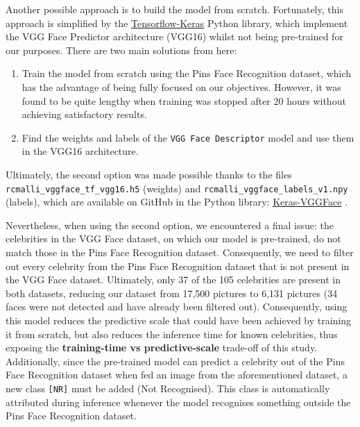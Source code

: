 \documentclass[9pt,twocolumn,twoside]{ilcss}
\theoremstyle{definition}
\theoremstyle{remark}
\theoremstyle{definition}
\theoremstyle{definition}
\begin{document}
        Another possible approach is to build the model from scratch. Fortunately, this approach is simplified by the \href{https://www.tensorflow.org/api_docs/python/tf/keras/applications/vgg16}{Tensorflow-Keras} Python library, which implement the VGG Face Predictor architecture (VGG16) \cite{simonyan2015deepconvolutionalnetworkslargescale} whilst not being pre-trained for our purposes. There are two main solutions from here:
        \begin{enumerate}[noitemsep,parsep=0pt,partopsep=0pt]
            \item Train the model from scratch using the Pins Face Recognition dataset, which has the advantage of being fully focused on our objectives. However, it was found to be quite lengthy when training was stopped after 20 hours without achieving satisfactory results.
            \item Find the weights and labels of the \texttt{VGG Face Descriptor} model and use them in the VGG16 architecture.
        \end{enumerate}

        Ultimately, the second option was made possible thanks to the files \texttt{rcmalli\_vggface\_tf\_vgg16.h5} (weights) and \texttt{rcmalli\_vggface\_labels\_v1.npy} (labels), which are available on GitHub in the Python library: \href{https://github.com/rcmalli/keras-vggface}{Keras-VGGFace} \cite{rcmalliKerasVGGFaces}.

        Nevertheless, when using the second option, we encountered a final issue: the celebrities in the VGG Face dataset, on which our model is pre-trained, do not match those in the Pins Face Recognition dataset. Consequently, we need to filter out every celebrity from the Pins Face Recognition dataset that is not present in the VGG Face dataset.
        Ultimately, only 37 of the 105 celebrities are present in both datasets, reducing our dataset from 17,500 pictures to 6,131 pictures (34 faces were not detected and have already been filtered out). Consequently, using this model reduces the predictive scale that could have been achieved by training it from scratch, but also reduces the inference time for known celebrities, thus exposing the \textbf{training-time vs predictive-scale} trade-off of this study.
        Additionally, since the pre-trained model can predict a celebrity out of the Pins Face Recognition dataset when fed an image from the aforementioned dataset, a new class \texttt{[NR]} must be added (Not Recognised). This class is automatically attributed during inference whenever the model recognises something outside the Pins Face Recognition dataset.
        
\end{document}
